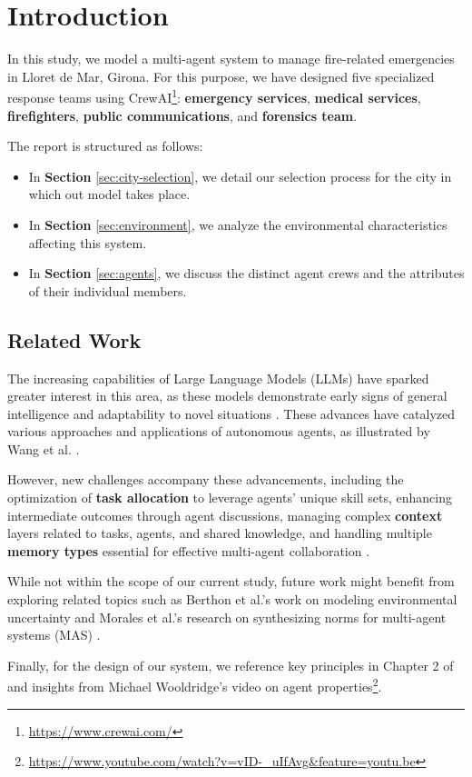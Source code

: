 \section{Introduction}
\label{sec:introduction}

In this study, we model a multi-agent system to manage fire-related emergencies in Lloret de Mar, Girona. For this purpose, we have designed five specialized response teams using CrewAI\footnote{\url{https://www.crewai.com/}}: \textbf{emergency services}, \textbf{medical services}, \textbf{firefighters}, \textbf{public communications}, and \textbf{forensics team}.

The report is structured as follows:
\begin{itemize}
    \item In \textbf{Section} \ref{sec:city-selection}, we detail our selection process for the city in which out model takes place.
    \item In \textbf{Section} \ref{sec:environment}, we analyze the environmental characteristics affecting this system.
    \item In \textbf{Section} \ref{sec:agents}, we discuss the distinct agent crews and the attributes of their individual members.
\end{itemize}

\subsection{Related Work}

The increasing capabilities of Large Language Models (LLMs) have sparked greater interest in this area, as these models demonstrate early signs of general intelligence \cite{bubeck2023sparksartificialgeneralintelligence} and adaptability to novel situations \cite{HAUPTMAN2023107451}. These advances have catalyzed various approaches and applications of autonomous agents, as illustrated by Wang et al. \cite{Wang_2024}.

However, new challenges accompany these advancements, including the optimization of \textbf{task allocation} to leverage agents' unique skill sets, enhancing intermediate outcomes through agent discussions, managing complex \textbf{context} layers related to tasks, agents, and shared knowledge, and handling multiple \textbf{memory types} essential for effective multi-agent collaboration \cite{han2024llmmultiagentsystemschallenges}.

While not within the scope of our current study, future work might benefit from exploring related topics such as Berthon et al.'s work on modeling environmental uncertainty \cite{berthon2024naturalstrategicabilitystochastic} and Morales et al.'s research on synthesizing norms for multi-agent systems (MAS) \cite{morales2017synthesisingevolutionarilystablenormative}.

Finally, for the design of our system, we reference key principles in Chapter 2 of \cite{wooldridge2009introduction} and insights from Michael Wooldridge's video on agent properties\footnote{\url{https://www.youtube.com/watch?v=vID-_uIfAvg&feature=youtu.be}}.

